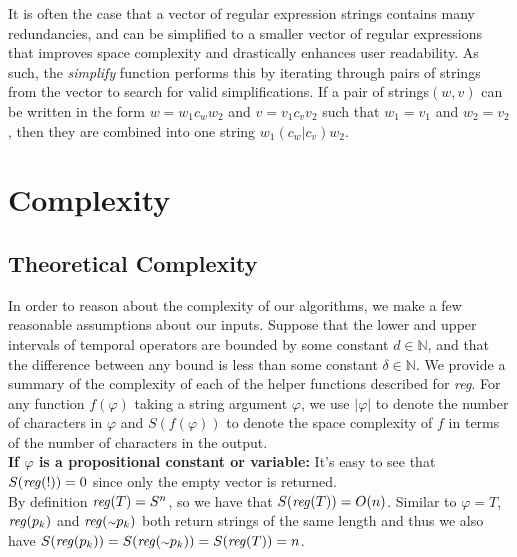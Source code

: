 \documentclass[runningheads]{llncs}
\renewcommand{\phi}{\varphi}
\begin{document}
It is often the case that a vector of regular expression strings contains many redundancies, and can be simplified to a smaller vector of regular expressions that improves space complexity and drastically enhances user readability. 
As such, the \textit{simplify} function performs this by iterating through pairs of strings from the vector to search for valid simplifications. 
If a pair of strings$(w, v)$ can be written in the form $w = w_1 c_w w_2$ and $v = v_1 c_v v_2$ such that $w_1 = v_1$ and $w_2 = v_2$, then they are combined into one string $w_1 (c_w | c_v) w_2$.


\section{Complexity} \label{complex}

\subsection{Theoretical Complexity}
 In order to reason about the complexity of our algorithms, we make a few reasonable assumptions about our inputs.
Suppose that the lower and upper intervals of temporal operators are bounded by some constant $d \in \mathbb{N}$, and that the difference between any bound is less than some constant $\delta \in \mathbb{N}$. 
We provide a summary of the complexity of each of the helper functions described for \textit{reg}. 
For any function $f(\phi)$ taking a string argument $\phi$, we use $|\phi|$ to denote the number of characters in $\phi$ and $S(f(\phi))$ to denote the space complexity of $f$ in terms of the number of characters in the output.\\
 
\textbf{If $\phi$ is a propositional constant or variable:}
    It's easy to see that $S(\text{\emph{reg}}(!)) = 0$ since only the empty vector is returned. \\
    By definition $\text{\emph{reg}}(T) = S^n$, so we have that $S(\text{\emph{reg}}(T)) = O(n)$. Similar to $\phi = T$, $\text{\emph{reg}}(p_k)$ and $\text{\emph{reg}}(\scriptstyle{\sim} \textstyle p_k)$ both return strings of the same length and thus we also have $S(\text{\emph{reg}}(p_k)) = S(\text{\emph{reg}}(\scriptstyle{\sim} \textstyle p_k)) = S(\text{\emph{reg}}(T)) = n$.\\
 
\end{document}
